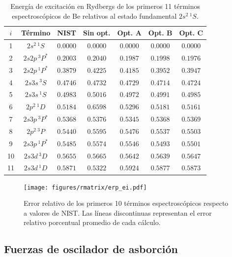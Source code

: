\begin{table}
\centering
\begin{tabular}{|*{7}{c|}}
\hline 
$i$ & Término & NIST & Sin opt. & Opt. A & Opt. B & Opt. C \\
\hline 
\hline 
1 & $2s^2\,^1S$   & $0.0000$ & $0.0000$ & $0.0000$ & $0.0000$ & $0.0000$ \\
2 & $2s2p\,^3P^*$ & $0.2003$ & $0.2040$ & $0.1987$ & $0.1998$ & $0.1976$ \\
3 & $2s2p\,^1P^*$ & $0.3879$ & $0.4225$ & $0.4185$ & $0.3952$ & $0.3947$ \\
4 & $2s3s\,^3S$   & $0.4746$ & $0.4732$ & $0.4729$ & $0.4714$ & $0.4724$ \\
5 & $2s3s\,^1S$   & $0.4983$ & $0.5016$ & $0.4972$ & $0.4991$ & $0.4985$ \\
6 & $2p^2\,^1D$   & $0.5184$ & $0.6598$ & $0.5296$ & $0.5181$ & $0.5161$ \\
7 & $2s3p\,^3P^*$ & $0.5368$ & $0.5376$ & $0.5345$ & $0.5368$ & $0.5369$ \\
8 & $2p^2\,^3P$   & $0.5440$ & $0.5595$ & $0.5476$ & $0.5537$ & $0.5503$ \\
9 & $2s3p\,^1P^*$ & $0.5485$ & $0.5574$ & $0.5546$ & $0.5493$ & $0.5501$ \\
10 & $2s3d\,^3D$  & $0.5655$ & $0.5665$ & $0.5642$ & $0.5639$ & $0.5647$ \\
11 & $2s3d\,^1D$  & $0.5871$ & $0.5322$ & $0.5924$ & $0.5877$ & $0.5873$ \\
\hline
\end{tabular}
\caption[Energías de excitación de Be.]
{Energía de excitación en Rydbergs de los primeros 11 términos 
espectroscópicos de Be relativos al estado fundamental $2s^2\,^1S$.}
\label{tab:exener}
\end{table}
\begin{figure}
\centering
\texttt{[image: figures/rmatrix/erp\_ei.pdf]} 
\caption[Error relativo de 10 términos espectroscópicos de Be.]
{Error relativo de los primeros 10 términos espectroscópicos respecto 
a valores de NIST. Las líneas discontinuas representan el error relativo
porcentual promedio de cada cálculo.}
\label{fig:exener}
\end{figure}

\subsection{Fuerzas de oscilador de asborción}

